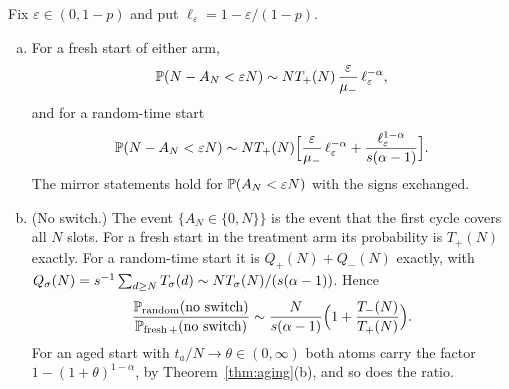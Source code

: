 \begin{corollary}\label{cor:exposure-tail}
Fix $\varepsilon\in(0,1-p)$ and put $\ell_\varepsilon=1-\varepsilon/(1-p)$.
\begin{enumerate}[(a)]
\item For a fresh start of either arm,
\[
 \mathbb{P}(N-A_N<\varepsilon N)\sim NT_{+}(N)\,\frac{\varepsilon}{\mu_{-}}\,\ell_\varepsilon^{-\alpha},
\]
and for a random-time start
\[
 \mathbb{P}(N-A_N<\varepsilon N)\sim NT_{+}(N)\Bigl[\frac{\varepsilon}{\mu_{-}}\,\ell_\varepsilon^{-\alpha}
 +\frac{\ell_\varepsilon^{1-\alpha}}{s(\alpha-1)}\Bigr].
\]
The mirror statements hold for $\mathbb{P}(A_N<\varepsilon N)$ with the signs exchanged.
\item (No switch.) The event $\{A_N\in\{0,N\}\}$ is the event that the first cycle covers all
$N$ slots. For a fresh start in the treatment arm its probability is $T_\plus(N)$ exactly. For
a random-time start it is $Q_\plus(N)+Q_\minus(N)$ exactly, with
$Q_\sigma(N)=s^{-1}\sum_{d\ge N}T_\sigma(d)\sim NT_\sigma(N)/(s(\alpha-1))$. Hence
\[
 \frac{\mathbb{P}_{\mathrm{random}}(\text{no switch})}{\mathbb{P}_{\mathrm{fresh}\,{+}}(\text{no switch})}
 \sim\frac{N}{s(\alpha-1)}\Bigl(1+\frac{T_{-}(N)}{T_{+}(N)}\Bigr).
\]
For an aged start with $t_a/N\to\theta\in(0,\infty)$ both atoms carry the factor
$1-(1+\theta)^{1-\alpha}$, by Theorem~\ref{thm:aging}(b), and so does the ratio.
\end{enumerate}
\end{corollary}

